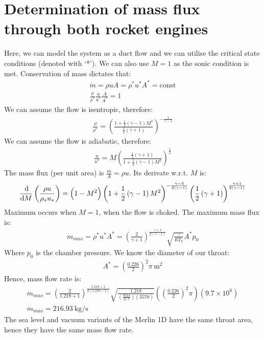 \documentclass[11pt]{article}
\numberwithin{equation}{section}
\begin{document}
\section{Determination of mass flux through both rocket engines}
Here, we can model the system as a duct flow and we can utilise the critical state conditions (denoted with `*'). We can also use $M=1$ as the sonic condition is met.
Conservation of mass dictates that:
\begin{gather}
    \dot{m} =\rho u A = \rho^* u^* A^* = \textrm{const}\\
    \frac{\rho}{\rho^*}\frac{u}{u^*}\frac{A}{A^*} = 1
\end{gather}
We can assume the flow is isentropic, therefore:
\begin{gather}
    \frac{\rho}{\rho^*} = \left(\frac{1+\frac{1}{2}\left(\gamma - 1\right)M^2}{\frac{1}{2}\left(\gamma + 1\right)}\right)^{-\frac{1}{\gamma - 1}}
\end{gather}
We can assume the flow is adiabatic, therefore:
\begin{gather}
    \frac{u}{u^*} = M\left(\frac{\frac{1}{2}\left(\gamma + 1\right)}{1 + \frac{1}{2}\left(\gamma - 1\right)M^2}\right)^{\frac{1}{2}}
\end{gather}
The mass flux (per unit area) is $\frac{m}{A} = \rho u$. Its derivate w.r.t. $M$ is:
\begin{gather}
    \frac{\dif}{\dif M}\left(\frac{\rho u}{\rho_* u_*}\right) = \left(1 - M^2\right)\left(1 + \frac{1}{2}\left(\gamma -1\right)M^2\right)^{-\frac{\gamma - 3}{2\left(\gamma - 1\right)}}\left(\frac{1}{2}\left(\gamma + 1\right)\right)^{\frac{\gamma + 1}{2\left(\gamma - 1\right)}}
\end{gather}
Maximum occurs when $M=1$, when the flow is choked. The maximum mass flux is:
\begin{gather}
    \dot{m}_{max} = \rho^* u^* A^* = \left(\frac{2}{\gamma + 1}\right)^{\frac{\gamma + 1}{2\left(\gamma -1\right)}}\sqrt{\frac{\gamma}{RT_0}} A^* p_0
\end{gather}
Where $p_0$ is the chamber pressure. We know the diameter of our throat:
\begin{gather}
    A^* = \left(\frac{0.226}{2}\right)^2 \pi \si{\, \meter\squared}
\end{gather}
Hence, mass flow rate is:
\begin{gather}
    \dot{m}_{max} = \left(\frac{2}{1.218 + 1}\right)^{\frac{1.218 + 1}{2\left(1.218 - 1\right)}}\sqrt{\frac{1.218}{\left(\frac{8314}{21.7}\right)\left(3570\right)}}\left(\left(\frac{0.226}{2}\right)^2\pi\right)\left(9.7\times 10^6\right)\\
    \dot{m}_{max} = \SI{216.93}{\kg\per\second}
\end{gather}
The sea level and vacuum variants of the Merlin 1D have the same throat area, hence they have the same mass flow rate.
\end{document}
